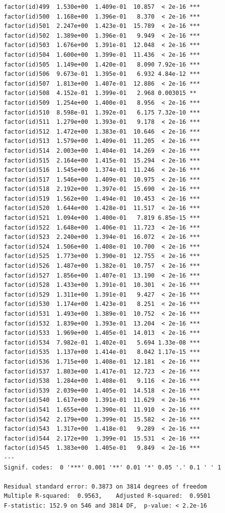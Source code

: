 \documentclass[]{book}
\begin{document}
\begin{verbatim}
factor(id)499  1.530e+00  1.409e-01  10.857  < 2e-16 ***
factor(id)500  1.168e+00  1.396e-01   8.370  < 2e-16 ***
factor(id)501  2.247e+00  1.423e-01  15.789  < 2e-16 ***
factor(id)502  1.389e+00  1.396e-01   9.949  < 2e-16 ***
factor(id)503  1.676e+00  1.391e-01  12.048  < 2e-16 ***
factor(id)504  1.600e+00  1.399e-01  11.436  < 2e-16 ***
factor(id)505  1.149e+00  1.420e-01   8.090 7.92e-16 ***
factor(id)506  9.673e-01  1.395e-01   6.932 4.84e-12 ***
factor(id)507  1.813e+00  1.407e-01  12.886  < 2e-16 ***
factor(id)508  4.152e-01  1.399e-01   2.968 0.003015 ** 
factor(id)509  1.254e+00  1.400e-01   8.956  < 2e-16 ***
factor(id)510  8.598e-01  1.392e-01   6.175 7.32e-10 ***
factor(id)511  1.279e+00  1.393e-01   9.178  < 2e-16 ***
factor(id)512  1.472e+00  1.383e-01  10.646  < 2e-16 ***
factor(id)513  1.579e+00  1.409e-01  11.205  < 2e-16 ***
factor(id)514  2.003e+00  1.404e-01  14.269  < 2e-16 ***
factor(id)515  2.164e+00  1.415e-01  15.294  < 2e-16 ***
factor(id)516  1.545e+00  1.374e-01  11.246  < 2e-16 ***
factor(id)517  1.546e+00  1.409e-01  10.975  < 2e-16 ***
factor(id)518  2.192e+00  1.397e-01  15.690  < 2e-16 ***
factor(id)519  1.562e+00  1.494e-01  10.453  < 2e-16 ***
factor(id)520  1.644e+00  1.428e-01  11.517  < 2e-16 ***
factor(id)521  1.094e+00  1.400e-01   7.819 6.85e-15 ***
factor(id)522  1.648e+00  1.406e-01  11.723  < 2e-16 ***
factor(id)523  2.240e+00  1.394e-01  16.072  < 2e-16 ***
factor(id)524  1.506e+00  1.408e-01  10.700  < 2e-16 ***
factor(id)525  1.773e+00  1.390e-01  12.755  < 2e-16 ***
factor(id)526  1.487e+00  1.382e-01  10.757  < 2e-16 ***
factor(id)527  1.856e+00  1.407e-01  13.190  < 2e-16 ***
factor(id)528  1.433e+00  1.391e-01  10.301  < 2e-16 ***
factor(id)529  1.311e+00  1.391e-01   9.427  < 2e-16 ***
factor(id)530  1.174e+00  1.423e-01   8.251  < 2e-16 ***
factor(id)531  1.493e+00  1.389e-01  10.752  < 2e-16 ***
factor(id)532  1.839e+00  1.393e-01  13.204  < 2e-16 ***
factor(id)533  1.969e+00  1.405e-01  14.013  < 2e-16 ***
factor(id)534  7.982e-01  1.402e-01   5.694 1.33e-08 ***
factor(id)535  1.137e+00  1.414e-01   8.042 1.17e-15 ***
factor(id)536  1.715e+00  1.408e-01  12.181  < 2e-16 ***
factor(id)537  1.803e+00  1.417e-01  12.723  < 2e-16 ***
factor(id)538  1.284e+00  1.408e-01   9.116  < 2e-16 ***
factor(id)539  2.039e+00  1.405e-01  14.518  < 2e-16 ***
factor(id)540  1.617e+00  1.391e-01  11.629  < 2e-16 ***
factor(id)541  1.655e+00  1.390e-01  11.910  < 2e-16 ***
factor(id)542  2.179e+00  1.399e-01  15.582  < 2e-16 ***
factor(id)543  1.317e+00  1.418e-01   9.289  < 2e-16 ***
factor(id)544  2.172e+00  1.399e-01  15.531  < 2e-16 ***
factor(id)545  1.383e+00  1.405e-01   9.849  < 2e-16 ***
---
Signif. codes:  0 '***' 0.001 '**' 0.01 '*' 0.05 '.' 0.1 ' ' 1

Residual standard error: 0.3873 on 3814 degrees of freedom
Multiple R-squared:  0.9563,    Adjusted R-squared:  0.9501 
F-statistic: 152.9 on 546 and 3814 DF,  p-value: < 2.2e-16
\end{verbatim}
\end{document}
